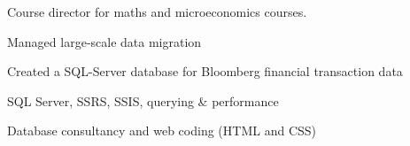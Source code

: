\documentclass[a4paper,nomath]{deedy-resume} %
\begin{document}
\begin{minipage}[t]{0.66\textwidth}
    \begin{tightitemize}
        \item Course director for maths and microeconomics courses.
    \end{tightitemize}

    \sectionspace %



    \begin{tightitemize}
        \item Managed large-scale data migration
        \item Created a SQL-Server database for Bloomberg financial transaction data
    \end{tightitemize}

    \sectionspace %



    \begin{tightitemize}
        \item SQL Server, SSRS, SSIS, querying \& performance
    \end{tightitemize}

    \sectionspace %
    


    \begin{tightitemize}
        \item Database consultancy and web coding (HTML and CSS)
    \end{tightitemize}

    \sectionspace %
    


\end{minipage}
\end{document}
